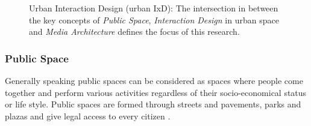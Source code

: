 \begin{figure} [h!]
\centering
\pagestyle{empty}

\def\firstcircle{(0,0) circle (2cm)}
\def\secondcircle{(1.6,-2.6) circle (2cm)}
\def\thirdcircle{(-1.6,-2.6) circle (2cm)}


\caption[Graphic illustrating key concepts of this PhD]{Urban Interaction Design (urban IxD): The intersection in between the key concepts of \textit{Public Space}, \textit{Interaction Design} in urban space and \textit{Media Architecture} defines the focus of this research. }
\label{keyconcept}
\end{figure}


\subsubsection* {Public Space}

Generally speaking public spaces can be considered as spaces where people come together and perform various activities regardless of their socio-economical status or life style. Public spaces are formed through streets and pavements, parks and plazas and give legal access to every citizen \cite{Lofland_1973}. 


